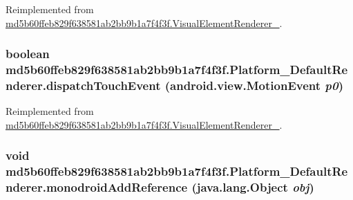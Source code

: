 Reimplemented from \hyperlink{classmd5b60ffeb829f638581ab2bb9b1a7f4f3f_1_1_visual_element_renderer__1_3ae26bd8575212fb6d6f14487b4f48d4}{md5b60ffeb829f638581ab2bb9b1a7f4f3f.VisualElementRenderer\_}.\hypertarget{classmd5b60ffeb829f638581ab2bb9b1a7f4f3f_1_1_platform___default_renderer_c2385d55d3936317073c71eb3232886e}{
\subsubsection[{dispatchTouchEvent}]{\setlength{\rightskip}{0pt plus 5cm}boolean md5b60ffeb829f638581ab2bb9b1a7f4f3f.Platform\_\-DefaultRenderer.dispatchTouchEvent (android.view.MotionEvent {\em p0})}}
\label{classmd5b60ffeb829f638581ab2bb9b1a7f4f3f_1_1_platform___default_renderer_c2385d55d3936317073c71eb3232886e}




Reimplemented from \hyperlink{classmd5b60ffeb829f638581ab2bb9b1a7f4f3f_1_1_visual_element_renderer__1_76b5ca405a881f2e09918f282c760285}{md5b60ffeb829f638581ab2bb9b1a7f4f3f.VisualElementRenderer\_}.\hypertarget{classmd5b60ffeb829f638581ab2bb9b1a7f4f3f_1_1_platform___default_renderer_799e1dac7b8eb2dce35fe56b86695b9d}{
\subsubsection[{monodroidAddReference}]{\setlength{\rightskip}{0pt plus 5cm}void md5b60ffeb829f638581ab2bb9b1a7f4f3f.Platform\_\-DefaultRenderer.monodroidAddReference (java.lang.Object {\em obj})}}
\label{classmd5b60ffeb829f638581ab2bb9b1a7f4f3f_1_1_platform___default_renderer_799e1dac7b8eb2dce35fe56b86695b9d}




